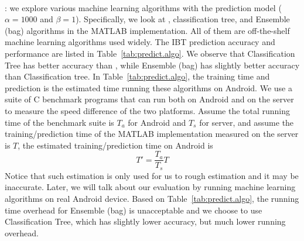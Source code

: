 \paragraph{\NAMEFULL}: we explore various machine learning algorithms with the \MostRecent prediction model ($\alpha=1000$ and $\beta=1$). %
Specifically, we look at \NB, classification tree, and Ensemble (bag) algorithms in the MATLAB implementation. All of them are off-the-shelf machine learning algorithms used widely. The IBT prediction accuracy and performance are listed in Table~\ref{tab:predict.algo}. We observe that Classification Tree has better accuracy than \NB, while Ensemble (bag) has slightly better accuracy than Classification tree. In Table~\ref{tab:predict.algo}, the training time and prediction is the estimated time running these algorithms on Android. We use a suite of C benchmark programs that can run both on Android and on the server to measure the speed difference of the two platforms. Assume the total running time of the benchmark suite is $T_{a}$ for Android and $T_{s}$ for server, and assume the training/prediction time of the MATLAB implementation measured on the server is $T$, the estimated training/prediction time on Android is
\begin{displaymath}
T' = \frac{T_{a}}{T_{s}}T
\end{displaymath}
Notice that such estimation is only used for us to rough estimation and it may be inaccurate. Later, we will talk about our evaluation by running machine learning algorithms on real Android device. Based on Table~\ref{tab:predict.algo},  the running time overhead for Ensemble (bag) is unacceptable and we choose to use Classification Tree, which has slightly lower accuracy, but much lower running overhead.

